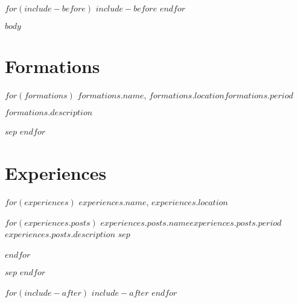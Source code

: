 \documentclass[
$if(fontsize)$
    $fontsize$,
$endif$
$if(lang)$
    $babel-lang$,
$endif$
$if(papersize)$
    $papersize$paper,
$endif$
$for(classoption)$
    $classoption$$sep$,
$endfor$
]{$documentclass$}
\begin{document}
$for(include-before)$
    $include-before$
$endfor$

$body$

\section{Formations}
\footnotesize
\begin{adjustwidth}{3cm}{0cm}
    $for(formations)$
    \textbf{$formations.name$}, $formations.location$\hfill \textit{$formations.period$}
        \begin{adjustwidth}{0.6cm}{0cm}
            $formations.description$
        \end{adjustwidth}
        $sep$\vspace{0.8cm}
    $endfor$
\end{adjustwidth}

\section{Experiences}
\footnotesize
\begin{adjustwidth}{3cm}{0cm}
    $for(experiences)$
    \textbf{$experiences.name$}, $experiences.location$
        \begin{adjustwidth}{0.6cm}{0cm}
            $for(experiences.posts)$
                \textit{$experiences.posts.name$}\hfill \textit{$experiences.posts.period$}\\
                $experiences.posts.description$
                $sep$\\\\
            $endfor$
        \end{adjustwidth}
        $sep$\vspace{0.8cm}
    $endfor$
\end{adjustwidth}

$for(include-after)$
    $include-after$
$endfor$

\end{document}
